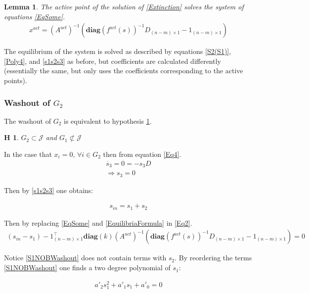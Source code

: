 \documentclass[3p,times]{article}
\newcommand{\diag}{\textbf{diag}}
\newtheorem{hypo}{H}
\newtheorem{lemma}{Lemma}
\begin{document}
\begin{lemma} 
	The active point of the solution of \eqref{Extinction} solves the system of equations \eqref{EqSome}. 
	\begin{align}
	\label{EqSome}x^{act} = (A^{act})^{-1}(\diag(f^{act}(s))^{-1}D_{(n-m)\times 1} - 1_{(n-m)\times 1})
	\end{align} 
\end{lemma} 


The equilibrium of the system is solved as described by equations \eqref{S2(S1)}, \eqref{Poly4}, and \eqref{s1s2s3} as before, but coefficients are calculated differently (essentially the same, but only uses the coefficients corresponding to the active points).

\subsubsection{Washout of $G_2$}

The washout of $G_2$ is equivalent to  hypothesis \ref{hypothesis washout G2}.

\begin{hypo}
	$G_2 \subset \mathcal{J}$ and $G_1 \not \subset \mathcal{J}$
	\label{hypothesis washout G2}
\end{hypo} 

In the case that $x_i = 0, \, \forall i \in G_2$ then from equation \eqref{Eq4}.
\begin{align}
\dot{s_3} = 0 = -s_3D \\
\Rightarrow s_3 = 0
\end{align}

Then by \eqref{s1s2s3} one obtains:

\begin{align}
s_{in} = s_1 + s_2
\end{align}

Then by replacing  \eqref{EqSome} and \eqref{EquilibriaFormula} in \eqref{Eq2}.
\begin{align}
\label{S1NOBWashout}  (s_{in}-s_1)-1_{(n-m)\times 1}^\top
\diag(k)(A^{act})^{-1}(\diag(f^{act}(s))^{-1}D_{(n-m)\times 1} - 1_{(n-m)\times 1}) = 0 
\end{align}

Notice \eqref{S1NOBWashout} does not contain terms with $s_2$. By reordering the terms \eqref{S1NOBWashout} one finds a two degree polynomial of $s_1$:

\begin{align}
a'_2 s_1^2 + a'_1s_1 + a'_0 = 0
\end{align}
\end{document}
